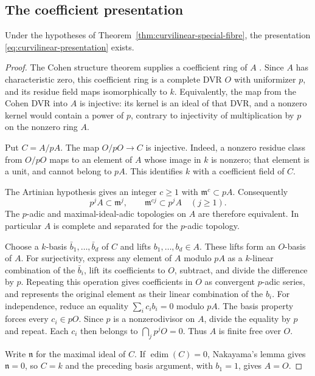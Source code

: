 \subsection{The coefficient presentation}

\begin{lemma}\label{lem:curvilinear-cohen-presentation}
Under the hypotheses of Theorem~\ref{thm:curvilinear-special-fibre},
the presentation \eqref{eq:curvilinear-presentation} exists.
\end{lemma}

\begin{proof}
The Cohen structure theorem supplies a coefficient ring of $A$
\citep[Theorem~10.160.8, Tag~032A]{Stacks2026}.  Since $A$ has
characteristic zero, this coefficient ring is a complete DVR $O$
with uniformizer $p$, and its residue field maps isomorphically
to $k$.  Equivalently, the map from the Cohen DVR into $A$ is
injective: its kernel is an ideal of that DVR, and a nonzero
kernel would contain a power of $p$, contrary to injectivity of
multiplication by $p$ on the nonzero ring $A$.

Put $C=A/pA$.  The map $O/pO\to C$ is injective.  Indeed, a
nonzero residue class from $O/pO$ maps to an element of $A$
whose image in $k$ is nonzero; that element is a unit, and
cannot belong to $pA$.  This identifies $k$ with a coefficient
field of $C$.

The Artinian hypothesis gives an integer $c\geq1$ with
$\mathfrak m^c\subset pA$.  Consequently
\[
 p^jA\subset\mathfrak m^j,\qquad
 \mathfrak m^{cj}\subset p^jA\quad(j\geq1).
\]
The $p$-adic and maximal-ideal-adic topologies on $A$ are
therefore equivalent.  In particular $A$ is complete and
separated for the $p$-adic topology.

Choose a $k$-basis $\bar b_1,\ldots,\bar b_d$ of $C$ and
lifts $b_1,\ldots,b_d\in A$.  These lifts form an $O$-basis
of $A$.  For surjectivity, express any element of $A$ modulo
$pA$ as a $k$-linear combination of the $\bar b_i$, lift its
coefficients to $O$, subtract, and divide the difference by
$p$.  Repeating this operation gives coefficients in $O$ as
convergent $p$-adic series, and represents the original element
as their linear combination of the $b_i$.  For independence,
reduce an equality $\sum_i c_i b_i=0$ modulo $pA$.  The basis
property forces every $c_i\in pO$.  Since $p$ is a
nonzerodivisor on $A$, divide the equality by $p$ and repeat.
Each $c_i$ then belongs to $\bigcap_jp^jO=0$.  Thus $A$ is
finite free over $O$.

Write $\mathfrak n$ for the maximal ideal of $C$.  If
$\operatorname{edim}(C)=0$, Nakayama's lemma gives
$\mathfrak n=0$, so $C=k$ and the preceding basis argument,
with $b_1=1$, gives $A=O$.


\end{proof}
